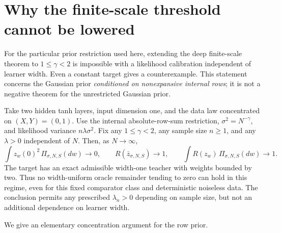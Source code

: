 \section{Why the finite-scale threshold cannot be lowered}
\label{sec:counterexample}

For the particular prior restriction used here, extending the deep finite-scale theorem to $1\leq\gamma<2$ is impossible with a likelihood calibration independent of learner width. Even a constant target gives a counterexample. This statement concerns the Gaussian prior \emph{conditioned on nonexpansive internal rows}; it is not a negative theorem for the unrestricted Gaussian prior.

\begin{theorem}[Failure below $\gamma=2$ for the conditioned prior]
\label{thm:finite-failure}
Take two hidden tanh layers, input dimension one, and the data law concentrated on $(X,Y)=(0,1)$. Use the internal absolute-row-sum restriction, $\sigma^2=N^{-\gamma}$, and likelihood variance $n\lambda\sigma^2$. Fix any $1\leq\gamma<2$, any sample size $n\geq1$, and any $\lambda>0$ independent of $N$. Then, as $N\to\infty$,
\[
 \int z_w(0)^2\,\Pi_{\sigma,N,S}(dw)\longrightarrow0,
 \qquad
 R(\bar z_{\sigma,N,S})\longrightarrow1,
 \qquad
 \int R(z_w)\,\Pi_{\sigma,N,S}(dw)\longrightarrow1.
\]
The target has an exact admissible width-one teacher with weights bounded by two. Thus no width-uniform oracle remainder tending to zero can hold in this regime, even for this fixed comparator class and deterministic noiseless data. The conclusion permits any prescribed $\lambda_n>0$ depending on sample size, but not an additional dependence on learner width.
\end{theorem}

We give an elementary concentration argument for the row prior.

